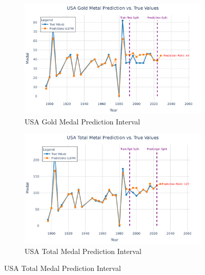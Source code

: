 \documentclass{mcmthesis}
\begin{document}
\begin{figure}[H]
	\centering
	\begin{subfigure}[b]{0.48\textwidth}
		\includegraphics[width=\textwidth]{fig/USA Gold Metal Prediction vs. True Values.png}
		\caption{USA Gold Medal Prediction Interval}
		\label{fig:usa_gold1}
	\end{subfigure}
	\hfill
	\begin{subfigure}[b]{0.48\textwidth}
		\includegraphics[width=\textwidth]{fig/USA Total Metal Prediction vs. True Values.png}
		\caption{USA Total Medal Prediction Interval}
		\label{fig:usa_total1}
	\end{subfigure}
	

\end{figure}
\end{document}
